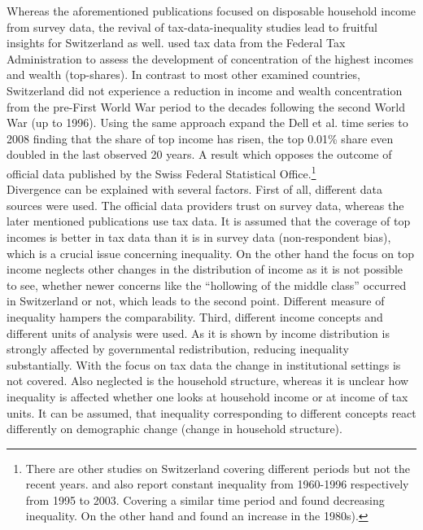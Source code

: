 \documentclass[twoside]{article}\usepackage[]{graphicx}\usepackage[]{color}
\begin{document}
\begin{multicols}{2}
Whereas the aforementioned publications focused on disposable household income from survey data, the revival of tax-data-inequality studies lead to fruitful insights for Switzerland as well. \citet{dell_income_2007} used tax data from the Federal Tax Administration to assess the development of concentration of the highest incomes and wealth (top-shares). In contrast to most other examined countries, Switzerland did not experience a reduction in income and wealth concentration from the pre-First World War period to the decades following the second World War (up to 1996). Using the same approach \citet{foellmi_volatile_2013} expand the Dell et al. time series to 2008 finding that the share of top income has risen, the top 0.01\% share even doubled in the last observed 20 years. A result which opposes the outcome of official data published by the Swiss Federal Statistical Office.\footnote{There are other studies on Switzerland covering different periods but not the recent years. \citet{fluckiger_egalite_2002} and also \citet{jeitziner_regionale_2007, jeitziner_regionale_2009} report constant inequality from 1960-1996 respectively from 1995 to 2003. Covering a similar time period \citet{bauer_verteilung_1994} and \citet{bolzani_distribution_2001} found decreasing inequality. On the other hand \citet{buchmann_zur_1995} and \citet{ernst_inequality_2000} found an increase in the 1980s).} \\


Divergence can be explained with several factors. First of all, different data sources were used. The official data providers trust on survey data, whereas the later mentioned publications use tax data. It is assumed that the coverage of top incomes is better in tax data than it is in survey data (non-respondent bias), which is a crucial issue concerning inequality. On the other hand the focus on top income neglects other changes in the distribution of income as it is not possible to see, whether newer concerns like the ``hollowing of the middle class'' occurred in Switzerland or not, which leads to the second point. Different measure of inequality hampers the comparability. Third, different income concepts and different units of analysis were used. As it is shown by \citet{modetta_einkommensungleichheit_2012} income distribution is strongly affected by governmental redistribution, reducing inequality substantially. With the focus on tax data the change in institutional settings is not covered. Also neglected is the household structure, whereas it is unclear how inequality is affected whether one looks at household income or at income of tax units. It can be assumed, that inequality corresponding to different concepts react differently on demographic change (change in household structure). 


\end{multicols}
\end{document}
